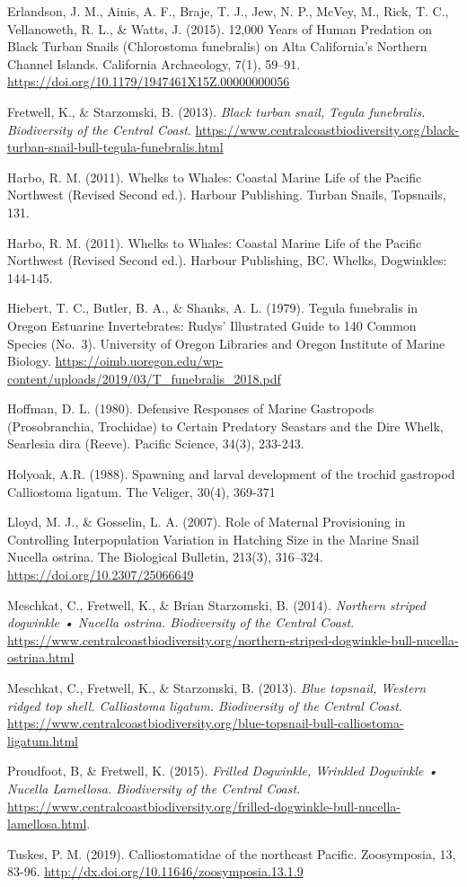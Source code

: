 \documentclass[
]{article}
\begin{document}
Erlandson, J. M., Ainis, A. F., Braje, T. J., Jew, N. P., McVey, M.,
Rick, T. C., Vellanoweth, R. L., \& Watts, J. (2015). 12,000 Years of
Human Predation on Black Turban Snails (Chlorostoma funebralis) on Alta
California's Northern Channel Islands. California Archaeology, 7(1),
59--91. \url{https://doi.org/10.1179/1947461X15Z.00000000056}

Fretwell, K., \& Starzomski, B. (2013). \emph{Black turban snail, Tegula
funebralis. Biodiversity of the Central Coast}.
\url{https://www.centralcoastbiodiversity.org/black-turban-snail-bull-tegula-funebralis.html}

Harbo, R. M. (2011). Whelks to Whales: Coastal Marine Life of the
Pacific Northwest (Revised Second ed.). Harbour Publishing. Turban
Snails, Topsnails, 131.

Harbo, R. M. (2011). Whelks to Whales: Coastal Marine Life of the
Pacific Northwest (Revised Second ed.). Harbour Publishing, BC. Whelks,
Dogwinkles: 144-145.

Hiebert, T. C., Butler, B. A., \& Shanks, A. L. (1979). Tegula
funebralis in Oregon Estuarine Invertebrates: Rudys' Illustrated Guide
to 140 Common Species (No.~3). University of Oregon Libraries and Oregon
Institute of Marine Biology.
\url{https://oimb.uoregon.edu/wp-content/uploads/2019/03/T_funebralis_2018.pdf}

Hoffman, D. L. (1980). Defensive Responses of Marine Gastropods
(Prosobranchia, Trochidae) to Certain Predatory Seastars and the Dire
Whelk, Searlesia dira (Reeve). Pacific Science, 34(3), 233-243.

Holyoak, A.R. (1988). Spawning and larval development of the trochid
gastropod Calliostoma ligatum. The Veliger, 30(4), 369-371

Lloyd, M. J., \& Gosselin, L. A. (2007). Role of Maternal Provisioning
in Controlling Interpopulation Variation in Hatching Size in the Marine
Snail Nucella ostrina. The Biological Bulletin, 213(3), 316--324.
\url{https://doi.org/10.2307/25066649}

Meschkat, C., Fretwell, K., \& Brian Starzomski, B. (2014).
\emph{Northern striped dogwinkle • Nucella ostrina. Biodiversity of the
Central Coast}.
\url{https://www.centralcoastbiodiversity.org/northern-striped-dogwinkle-bull-nucella-ostrina.html}

Meschkat, C., Fretwell, K., \& Starzomski, B. (2013). \emph{Blue
topsnail, Western ridged top shell. Calliostoma ligatum. Biodiversity of
the Central Coast}.
\url{https://www.centralcoastbiodiversity.org/blue-topsnail-bull-calliostoma-ligatum.html}

Proudfoot, B, \& Fretwell, K. (2015). \emph{Frilled Dogwinkle, Wrinkled
Dogwinkle • Nucella Lamellosa. Biodiversity of the Central Coast}.
\url{https://www.centralcoastbiodiversity.org/frilled-dogwinkle-bull-nucella-lamellosa.html}.

Tuskes, P. M. (2019). Calliostomatidae of the northeast Pacific.
Zoosymposia, 13, 83-96.
\url{http://dx.doi.org/10.11646/zoosymposia.13.1.9}
\end{document}

